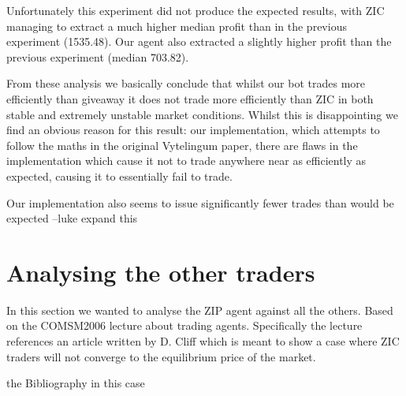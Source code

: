 \documentclass{acm_proc_article-sp}
\begin{document}
Unfortunately this experiment did not produce the expected results, with ZIC
managing to extract a much higher median profit than in the previous experiment
(1535.48). Our agent also extracted a slightly higher profit than the previous
experiment (median 703.82).

From these analysis we basically conclude that whilst our bot trades more
efficiently than giveaway it does not trade more efficiently than ZIC in both
stable and extremely unstable market conditions. Whilst this is disappointing
we find an obvious reason for this result: our implementation, which attempts
to follow the maths in the original Vytelingum\cite{Vytellingum:AA} paper,
there are flaws in the implementation which cause it not to trade anywhere near
as efficiently as expected, causing it to essentially fail to trade.

Our implementation also seems to issue significantly fewer trades than would be
expected
--luke expand this

\section{Analysing the other traders}

In this section we wanted to analyse the ZIP agent against all the others.
Based on the COMSM2006\cite{cliff:lecture} lecture about trading agents.
Specifically the lecture references an article written by D. Cliff which is
meant to show a case where ZIC traders will not converge to the equilibrium
price of the market\cite{cliff:minimalint}.

%
the Bibliography in this case
%
%
\appendix 
\end{document}
